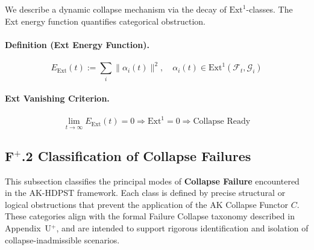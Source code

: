 \documentclass[11pt]{article}
\begin{document}
We describe a dynamic collapse mechanism via the decay of \( \mathrm{Ext}^1 \)-classes. The Ext energy function quantifies categorical obstruction.

\paragraph{Definition (Ext Energy Function).}
\[
E_{\mathrm{Ext}}(t) := \sum_i \| \alpha_i(t) \|^2, \quad \alpha_i(t) \in \mathrm{Ext}^1(\mathcal{F}_t, \mathcal{G}_i)
\]

\paragraph{Ext Vanishing Criterion.}
\[
\lim_{t \to \infty} E_{\mathrm{Ext}}(t) = 0 \Rightarrow \mathrm{Ext}^1 = 0 \Rightarrow \text{Collapse Ready}
\]

\subsection*{F$^+$.2 Classification of Collapse Failures}

This subsection classifies the principal modes of \textbf{Collapse Failure} encountered in the AK-HDPST framework. Each class is defined by precise structural or logical obstructions that prevent the application of the AK Collapse Functor \( C \). These categories align with the formal Failure Collapse taxonomy described in Appendix~U$^+$, and are intended to support rigorous identification and isolation of collapse-inadmissible scenarios.
\end{document}
